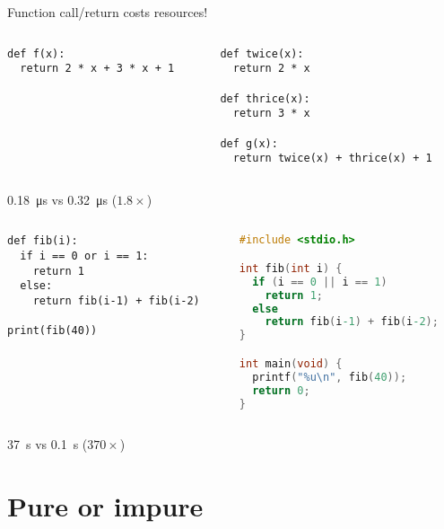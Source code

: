 \documentclass[aspectratio=169]{beamer}
\newcommand{\style}[1]{\ttfamily#1}
\begin{document}
\begin{frame}[fragile]
Function call/return costs resources!
\pause
\begin{columns}
\begin{column}{0.5\textwidth}
\begin{lstlisting}[basicstyle=\style{\small}]
def f(x):
  return 2 * x + 3 * x + 1
\end{lstlisting}
\end{column}

\begin{column}{0.5\textwidth}
\begin{lstlisting}[basicstyle=\style{\small}]
def twice(x):
  return 2 * x

def thrice(x):
  return 3 * x

def g(x):
  return twice(x) + thrice(x) + 1
\end{lstlisting}

\end{column}
\end{columns}
\pause
\SI{0.18}{\us} vs \SI{0.32}{\us} ($1.8\times$)
\end{frame}

\begin{frame}[fragile]
\begin{columns}
\begin{column}{0.5\textwidth}
\begin{lstlisting}[basicstyle=\style{\tiny}]
def fib(i):
  if i == 0 or i == 1:
    return 1
  else:
    return fib(i-1) + fib(i-2)

print(fib(40))
\end{lstlisting}
\end{column}
\begin{column}{0.5\textwidth}
\begin{lstlisting}[basicstyle=\style{\tiny},language=C]
#include <stdio.h>

int fib(int i) {
  if (i == 0 || i == 1)
    return 1;
  else
    return fib(i-1) + fib(i-2);
}

int main(void) {
  printf("%u\n", fib(40));
  return 0;
}
\end{lstlisting}
\end{column}
\end{columns}
\pause
\SI{37}{\s} vs \SI{0.1}{\s} ($370\times$)
\end{frame}

\section{Pure or impure}
\end{document}
